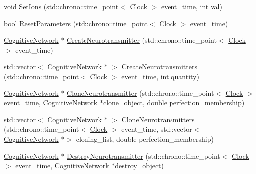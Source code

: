 \begin{DoxyCompactItemize}
\item 
\mbox{\hyperlink{glad_8h_a950fc91edb4504f62f1c577bf4727c29}{void}} \mbox{\hyperlink{class_membrane_channel_a1fe0c61eccbb6aa0d905ead27e8337bd}{Set\+Ions}} (std\+::chrono\+::time\+\_\+point$<$ \mbox{\hyperlink{universe_8h_a0ef8d951d1ca5ab3cfaf7ab4c7a6fd80}{Clock}} $>$ event\+\_\+time, int \mbox{\hyperlink{glad_8h_a26942fd2ed566ef553eae82d2c109c8f}{val}})
\item 
bool \mbox{\hyperlink{class_membrane_channel_a5982040b46efe5e2b824d1cf4dead25e}{Reset\+Parameters}} (std\+::chrono\+::time\+\_\+point$<$ \mbox{\hyperlink{universe_8h_a0ef8d951d1ca5ab3cfaf7ab4c7a6fd80}{Clock}} $>$ event\+\_\+time)
\item 
\mbox{\hyperlink{class_cognitive_network}{Cognitive\+Network}} $\ast$ \mbox{\hyperlink{class_membrane_channel_aa8e78a1b0dd7c6b81cac09d33f01e6c2}{Create\+Neurotransmitter}} (std\+::chrono\+::time\+\_\+point$<$ \mbox{\hyperlink{universe_8h_a0ef8d951d1ca5ab3cfaf7ab4c7a6fd80}{Clock}} $>$ event\+\_\+time)
\item 
std\+::vector$<$ \mbox{\hyperlink{class_cognitive_network}{Cognitive\+Network}} $\ast$ $>$ \mbox{\hyperlink{class_membrane_channel_a24c791e6cfd906d49e0ceb8a24eeb4cb}{Create\+Neurotransmitters}} (std\+::chrono\+::time\+\_\+point$<$ \mbox{\hyperlink{universe_8h_a0ef8d951d1ca5ab3cfaf7ab4c7a6fd80}{Clock}} $>$ event\+\_\+time, int quantity)
\item 
\mbox{\hyperlink{class_cognitive_network}{Cognitive\+Network}} $\ast$ \mbox{\hyperlink{class_membrane_channel_af667720bd2214ea3a1e6d272b57d3a79}{Clone\+Neurotransmitter}} (std\+::chrono\+::time\+\_\+point$<$ \mbox{\hyperlink{universe_8h_a0ef8d951d1ca5ab3cfaf7ab4c7a6fd80}{Clock}} $>$ event\+\_\+time, \mbox{\hyperlink{class_cognitive_network}{Cognitive\+Network}} $\ast$clone\+\_\+object, double perfection\+\_\+membership)
\item 
std\+::vector$<$ \mbox{\hyperlink{class_cognitive_network}{Cognitive\+Network}} $\ast$ $>$ \mbox{\hyperlink{class_membrane_channel_a6426185a0d73c967adcb72e3a22b48b0}{Clone\+Neurotransmitters}} (std\+::chrono\+::time\+\_\+point$<$ \mbox{\hyperlink{universe_8h_a0ef8d951d1ca5ab3cfaf7ab4c7a6fd80}{Clock}} $>$ event\+\_\+time, std\+::vector$<$ \mbox{\hyperlink{class_cognitive_network}{Cognitive\+Network}} $\ast$$>$ cloning\+\_\+list, double perfection\+\_\+membership)
\item 
\mbox{\hyperlink{class_cognitive_network}{Cognitive\+Network}} $\ast$ \mbox{\hyperlink{class_membrane_channel_a985d8f93077b0f93daa9c311a22917a1}{Destroy\+Neurotransmitter}} (std\+::chrono\+::time\+\_\+point$<$ \mbox{\hyperlink{universe_8h_a0ef8d951d1ca5ab3cfaf7ab4c7a6fd80}{Clock}} $>$ event\+\_\+time, \mbox{\hyperlink{class_cognitive_network}{Cognitive\+Network}} $\ast$destroy\+\_\+object)
$$
\end{DoxyCompactItemize}
